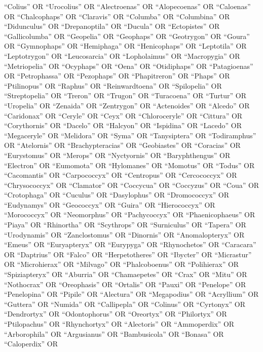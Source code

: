 \documentclass[
  number,
  review,
  onecolumn]{elsarticle}
\begin{document}
``Colius'' OR ``Urocolius'' OR ``Alectroenas'' OR ``Alopecoenas'' OR
``Caloenas'' OR ``Chalcophaps'' OR ``Claravis'' OR ``Columba'' OR
``Columbina'' OR ``Didunculus'' OR ``Drepanoptila'' OR ``Ducula'' OR
``Ectopistes'' OR ``Gallicolumba'' OR ``Geopelia'' OR ``Geophaps'' OR
``Geotrygon'' OR ``Goura'' OR ``Gymnophaps'' OR ``Hemiphaga'' OR
``Henicophaps'' OR ``Leptotila'' OR ``Leptotrygon'' OR ``Leucosarcia''
OR ``Lopholaimus'' OR ``Macropygia'' OR ``Metriopelia'' OR ``Ocyphaps''
OR ``Oena'' OR ``Otidiphaps'' OR ``Patagioenas'' OR ``Petrophassa'' OR
``Pezophaps'' OR ``Phapitreron'' OR ``Phaps'' OR ``Ptilinopus'' OR
``Raphus'' OR ``Reinwardtoena'' OR ``Spilopelia'' OR ``Streptopelia'' OR
``Treron'' OR ``Trugon'' OR ``Turacoena'' OR ``Turtur'' OR ``Uropelia''
OR ``Zenaida'' OR ``Zentrygon'' OR ``Actenoides'' OR ``Alcedo'' OR
``Caridonax'' OR ``Ceryle'' OR ``Ceyx'' OR ``Chloroceryle'' OR
``Cittura'' OR ``Corythornis'' OR ``Dacelo'' OR ``Halcyon'' OR
``Ispidina'' OR ``Lacedo'' OR ``Megaceryle'' OR ``Melidora'' OR ``Syma''
OR ``Tanysiptera'' OR ``Todiramphus'' OR ``Atelornis'' OR
``Brachypteracias'' OR ``Geobiastes'' OR ``Coracias'' OR ``Eurystomus''
OR ``Merops'' OR ``Nyctyornis'' OR ``Baryphthengus'' OR ``Electron'' OR
``Eumomota'' OR ``Hylomanes'' OR ``Momotus'' OR ``Todus'' OR
``Cacomantis'' OR ``Carpococcyx'' OR ``Centropus'' OR ``Cercococcyx'' OR
``Chrysococcyx'' OR ``Clamator'' OR ``Coccycua'' OR ``Coccyzus'' OR
``Coua'' OR ``Crotophaga'' OR ``Cuculus'' OR ``Dasylophus'' OR
``Dromococcyx'' OR ``Eudynamys'' OR ``Geococcyx'' OR ``Guira'' OR
``Hierococcyx'' OR ``Morococcyx'' OR ``Neomorphus'' OR ``Pachycoccyx''
OR ``Phaenicophaeus'' OR ``Piaya'' OR ``Rhinortha'' OR ``Scythrops'' OR
``Surniculus'' OR ``Tapera'' OR ``Urodynamis'' OR ``Zanclostomus'' OR
``Dinornis'' OR ``Anomalopteryx'' OR ``Emeus'' OR ``Euryapteryx'' OR
``Eurypyga'' OR ``Rhynochetos'' OR ``Caracara'' OR ``Daptrius'' OR
``Falco'' OR ``Herpetotheres'' OR ``Ibycter'' OR ``Micrastur'' OR
``Microhierax'' OR ``Milvago'' OR ``Phalcoboenus'' OR ``Polihierax'' OR
``Spiziapteryx'' OR ``Aburria'' OR ``Chamaepetes'' OR ``Crax'' OR
``Mitu'' OR ``Nothocrax'' OR ``Oreophasis'' OR ``Ortalis'' OR ``Pauxi''
OR ``Penelope'' OR ``Penelopina'' OR ``Pipile'' OR ``Alectura'' OR
``Megapodius'' OR ``Acryllium'' OR ``Guttera'' OR ``Numida'' OR
``Callipepla'' OR ``Colinus'' OR ``Cyrtonyx'' OR ``Dendrortyx'' OR
``Odontophorus'' OR ``Oreortyx'' OR ``Philortyx'' OR ``Ptilopachus'' OR
``Rhynchortyx'' OR ``Alectoris'' OR ``Ammoperdix'' OR ``Arborophila'' OR
``Argusianus'' OR ``Bambusicola'' OR ``Bonasa'' OR ``Caloperdix'' OR
\end{document}
